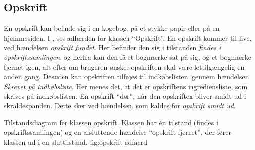 \subsection{Opskrift}
En opskrift kan befinde sig i en kogebog, på et stykke papir eller på en hjemmesiden. I , ses adfærden for klassen ``Opskrift''. En opskrift kommer til live, ved hændelsen \textit{opskrift fundet}. Her befinder den sig i tilstanden \textit{findes i opskriftssamlingen}, og herfra kan den få et bogmærke sat på sig, og et bogmærke fjernet igen, alt efter om brugeren ønsker opskriften skal være lettilgængelig en anden gang. Desuden kan opskriften tilføjes til indkøbslisten igennem hændelsen \textit{Skrevet på indkøbsliste}. Her menes det, at det er opskriftens ingrediensliste, som skrives på indkøbslisten. En opskrift ``dør'', når den opskriften bliver smidt ud i skraldespanden. Dette sker ved hændelsen, som kaldes for \textit{opskrift smidt ud}.  

  {Tilstandsdiagram for klassen opskrift. Klassen har én tilstand (findes i opskriftssamlingen) og en afsluttende hændelse ``opskrift fjernet'', der fører klassen ud i en sluttilstand.}
  {fig:opskrift-adfaerd}
